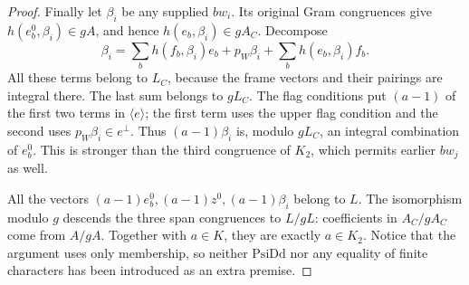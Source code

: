 \begin{proof}
Finally let \(\beta_i\) be any supplied \(bw_i\).  Its original
Gram congruences give \(h(e_b^0,\beta_i)\in gA\), and hence
\(h(e_b,\beta_i)\in gA_C\).  Decompose
\[
 \beta_i=\sum_b h(f_b,\beta_i)e_b+p_W\beta_i
                              +\sum_b h(e_b,\beta_i)f_b.
\]
All these terms belong to \(L_C\), because the frame vectors
and their pairings are integral there.  The last sum belongs to
\(gL_C\).  The flag conditions put \((a-1)\) of the first
two terms in \(\langle e\rangle\); the first term uses the
upper flag condition and the second uses \(p_W\beta_i\in e^\perp\).
Thus \((a-1)\beta_i\) is, modulo \(gL_C\), an integral
combination of \(e_b^0\).  This is stronger than the third
congruence of \(K_2\), which permits earlier \(bw_j\) as well.

All the vectors \((a-1)e_b^0,(a-1)z^0,(a-1)\beta_i\)
belong to \(L\).  The isomorphism modulo \(g\) descends the
three span congruences to \(L/gL\): coefficients in \(A_C/gA_C\)
come from \(A/gA\).  Together with \(a\in K\), they are
exactly \(a\in K_2\).  Notice that the argument uses only
membership, so neither \(\mathrm{PsiDd}\) nor any equality of
finite characters has been introduced as an extra premise.
\end{proof}

